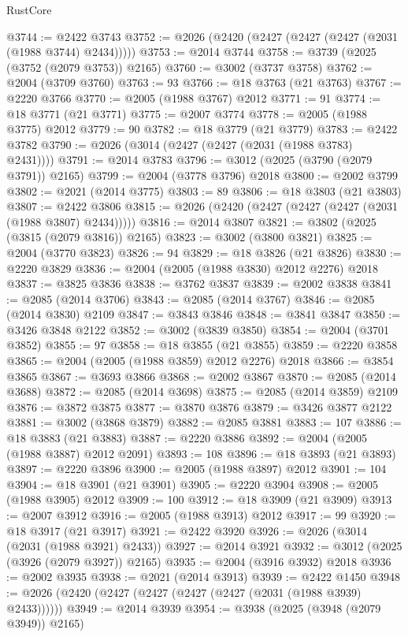 \begin{lexlean}{RustCore}
\begin{coremodule}
@3744 := @2422 @3743
@3752 := @2026 (@2420 (@2427 (@2427 (@2427 (@2031 (@1988 @3744) @2434)))))
@3753 := @2014 @3744
@3758 := @3739 (@2025 (@3752 (@2079 @3753)) @2165)
@3760 := @3002 (@3737 @3758)
@3762 := @2004 (@3709 @3760)
@3763 := 93
@3766 := @18 @3763 (@21 @3763)
@3767 := @2220 @3766
@3770 := @2005 (@1988 @3767) @2012
@3771 := 91
@3774 := @18 @3771 (@21 @3771)
@3775 := @2007 @3774
@3778 := @2005 (@1988 @3775) @2012
@3779 := 90
@3782 := @18 @3779 (@21 @3779)
@3783 := @2422 @3782
@3790 := @2026 (@3014 (@2427 (@2427 (@2031 (@1988 @3783) @2431))))
@3791 := @2014 @3783
@3796 := @3012 (@2025 (@3790 (@2079 @3791)) @2165)
@3799 := @2004 (@3778 @3796) @2018
@3800 := @2002 @3799
@3802 := @2021 (@2014 @3775)
@3803 := 89
@3806 := @18 @3803 (@21 @3803)
@3807 := @2422 @3806
@3815 := @2026 (@2420 (@2427 (@2427 (@2427 (@2031 (@1988 @3807) @2434)))))
@3816 := @2014 @3807
@3821 := @3802 (@2025 (@3815 (@2079 @3816)) @2165)
@3823 := @3002 (@3800 @3821)
@3825 := @2004 (@3770 @3823)
@3826 := 94
@3829 := @18 @3826 (@21 @3826)
@3830 := @2220 @3829
@3836 := @2004 (@2005 (@1988 @3830) @2012 @2276) @2018
@3837 := @3825 @3836
@3838 := @3762 @3837
@3839 := @2002 @3838
@3841 := @2085 (@2014 @3706)
@3843 := @2085 (@2014 @3767)
@3846 := @2085 (@2014 @3830) @2109
@3847 := @3843 @3846
@3848 := @3841 @3847
@3850 := @3426 @3848 @2122
@3852 := @3002 (@3839 @3850)
@3854 := @2004 (@3701 @3852)
@3855 := 97
@3858 := @18 @3855 (@21 @3855)
@3859 := @2220 @3858
@3865 := @2004 (@2005 (@1988 @3859) @2012 @2276) @2018
@3866 := @3854 @3865
@3867 := @3693 @3866
@3868 := @2002 @3867
@3870 := @2085 (@2014 @3688)
@3872 := @2085 (@2014 @3698)
@3875 := @2085 (@2014 @3859) @2109
@3876 := @3872 @3875
@3877 := @3870 @3876
@3879 := @3426 @3877 @2122
@3881 := @3002 (@3868 @3879)
@3882 := @2085 @3881
@3883 := 107
@3886 := @18 @3883 (@21 @3883)
@3887 := @2220 @3886
@3892 := @2004 (@2005 (@1988 @3887) @2012 @2091)
@3893 := 108
@3896 := @18 @3893 (@21 @3893)
@3897 := @2220 @3896
@3900 := @2005 (@1988 @3897) @2012
@3901 := 104
@3904 := @18 @3901 (@21 @3901)
@3905 := @2220 @3904
@3908 := @2005 (@1988 @3905) @2012
@3909 := 100
@3912 := @18 @3909 (@21 @3909)
@3913 := @2007 @3912
@3916 := @2005 (@1988 @3913) @2012
@3917 := 99
@3920 := @18 @3917 (@21 @3917)
@3921 := @2422 @3920
@3926 := @2026 (@3014 (@2031 (@1988 @3921) @2433))
@3927 := @2014 @3921
@3932 := @3012 (@2025 (@3926 (@2079 @3927)) @2165)
@3935 := @2004 (@3916 @3932) @2018
@3936 := @2002 @3935
@3938 := @2021 (@2014 @3913)
@3939 := @2422 @1450
@3948 := @2026 (@2420 (@2427 (@2427 (@2427 (@2427 (@2031 (@1988 @3939) @2433))))))
@3949 := @2014 @3939
@3954 := @3938 (@2025 (@3948 (@2079 @3949)) @2165)

\end{coremodule}
\end{lexlean}
